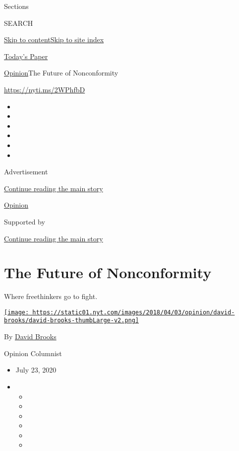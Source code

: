 Sections

SEARCH

\protect\hyperlink{site-content}{Skip to
content}\protect\hyperlink{site-index}{Skip to site index}

\href{https://myaccount.nytimes.com/auth/login?response_type=cookie\&client_id=vi}{}

\href{https://www.nytimes.com/section/todayspaper}{Today's Paper}

\href{/section/opinion}{Opinion}\textbar{}The Future of Nonconformity

\href{https://nyti.ms/2WPhfbD}{https://nyti.ms/2WPhfbD}

\begin{itemize}
\item
\item
\item
\item
\item
\item
\end{itemize}

Advertisement

\protect\hyperlink{after-top}{Continue reading the main story}

\href{/section/opinion}{Opinion}

Supported by

\protect\hyperlink{after-sponsor}{Continue reading the main story}

\hypertarget{the-future-of-nonconformity}{%
\section{The Future of
Nonconformity}\label{the-future-of-nonconformity}}

Where freethinkers go to fight.

\href{https://www.nytimes.com/by/david-brooks}{\texttt{[image: https://static01.nyt.com/images/2018/04/03/opinion/david-brooks/david-brooks-thumbLarge-v2.png]}}

By \href{https://www.nytimes.com/by/david-brooks}{David Brooks}

Opinion Columnist

\begin{itemize}
\item
  July 23, 2020
\item
  \begin{itemize}
  \item
  \item
  \item
  \item
  \item
  \item
  \end{itemize}
\end{itemize}


